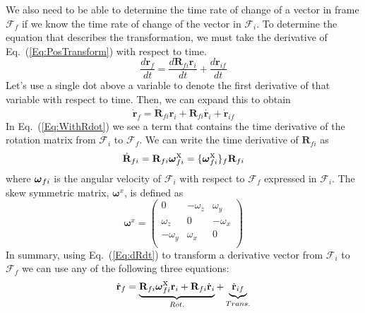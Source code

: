 We also need to be able to determine the time rate of change of a
vector in frame $\mathcal{F}_f$ if we know the time rate of change
of the vector in $\mathcal{F}_i$.  To determine the equation that
describes the transformation, we must take the derivative of
Eq.~(\ref{Eq:PosTransform}) with respect to time.
\begin{equation}
     \frac{d\mathbf{r}_{f}}{dt} = \frac{d\mathbf{R}_{fi}\mathbf{r}_{i}}{dt}
     +\frac{d \mathbf{r}_{if}}{dt}
\end{equation}
%
Let's use a single dot above a variable to denote the first
derivative of that variable with respect to time.  Then, we can
expand this to obtain
%
\begin{equation}
     \dot{\mathbf{r}}_{f} = \dot{\mathbf{R}}_{fi}\mathbf{r}_{i} +
     \mathbf{R}_{fi}\dot{\mathbf{r}_{i}}
     +\dot{ \mathbf{r}}_{if}  \label{Eq:WithRdot}
\end{equation}
%
In Eq.~(\ref{Eq:WithRdot}) we see a term that contains the time
derivative of the rotation matrix from $\mathcal{F}_i$ to
$\mathcal{F}_f$.  We can write the time derivative of
$\mathbf{R}_{fi}$ as
%
\begin{equation}
     \dot{\mathbf{R}}_{fi} = \mathbf{R}_{fi}
     \mbox{\boldmath{$\omega $}}^{\mbox{x}}_{fi} =  \{\mbox{\boldmath{$\omega
     $}}^{\mbox{x}}_{fi}\}_f\mathbf{R}_{fi}\label{Eq:dRdt}
\end{equation}
%
where $\mbox{\boldmath{$\omega $}}_{fi}$ is the angular velocity of
$\mathcal{F}_i$ with respect to $\mathcal{F}_f$ expressed in
$\mathcal{F}_i$.  The skew symmetric matrix, $\boldsymbol \omega
^x$, is defined as
\begin{equation}
\boldsymbol \omega ^x= \left( \begin{array}{ccc}
  0 & -\omega_z  & \omega_y \\
  \omega_z & 0 & -\omega_x \\
  -\omega_y & \omega_x & 0 \\
\end{array} \right)
\end{equation}
%
In summary, using Eq.~(\ref{Eq:dRdt}) to transform a derivative
vector from $\mathcal{F}_i$  to $\mathcal{F}_f$ we can use any of
the following three equations:
%
\begin{equation}
     \dot{\mathbf{r}}_{f}  = \underbrace{\mathbf{R}_{fi}
     \mbox{\boldmath{$\omega $}}^{\mbox{x}}_{fi}\mathbf{r}_{i} + \mathbf{R}_{fi}\dot{\mathbf{r}}_{i}}_{Rot.}
     + \underbrace{\dot{\mathbf{r}}_{if}}_{Trans.} \label{Eq:Transform1}
\end{equation}
